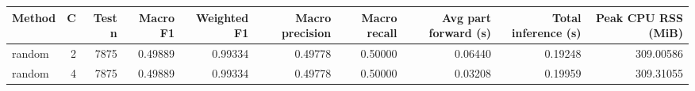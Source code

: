 \begin{tabular}{lrrrrrrrrr}
\toprule
Method & C & Test n & Macro F1 & Weighted F1 & Macro precision & Macro recall & Avg part forward (s) & Total inference (s) & Peak CPU RSS (MiB) \\
\midrule
random & 2 & 7875 & 0.49889 & 0.99334 & 0.49778 & 0.50000 & 0.06440 & 0.19248 & 309.00586 \\
random & 4 & 7875 & 0.49889 & 0.99334 & 0.49778 & 0.50000 & 0.03208 & 0.19959 & 309.31055 \\
\bottomrule
\end{tabular}
